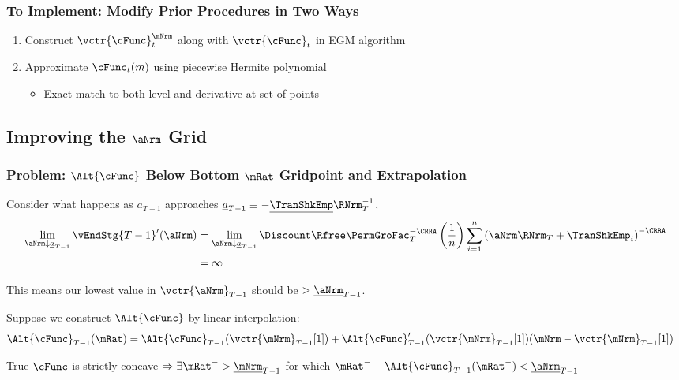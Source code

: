 \documentclass{beamer}
\begin{document}
\begin{frame}
\frametitle{To Implement: Modify Prior Procedures in Two Ways}
\begin{enumerate}
\item Construct $\vctr{\cFunc}^{\mNrm}_{t}$ along with $\vctr{\cFunc}_{t}$ in EGM algorithm
\item Approximate $\cFunc_{t}(m)$ using piecewise Hermite polynomial
\begin{itemize}
\item Exact match to both level and derivative at set of points
\end{itemize}
\end{enumerate}
\end{frame}


\subsection{Improving the $\aNrm$ Grid}

\begin{frame}
\frametitle{Problem: $\Alt{\cFunc}$ Below Bottom $\mRat$ Gridpoint and Extrapolation}

Consider what happens as $a_{T-1}$ approaches $\underline{a}_{T-1}\equiv-\underline{\TranShkEmp}\RNrm_{T}^{-1}$,
\begin{equation*}\begin{gathered}\begin{aligned}
        \lim_{{\aNrm} \downarrow \underline{a}_{T-1}} \vEndStg{T-1}^{\prime}(\aNrm) 
& =         \lim_{{\aNrm} \downarrow \underline{a}_{T-1}} \Discount \Rfree \PermGroFac_{T}^{-\CRRA} \left(\frac{1}{n}\right) \sum_{i=1}^{n} \left(  \aNrm\RNrm_{T}+ \TranShkEmp_{i}\right)^{-\CRRA}
\\  & = \infty
\end{aligned}\end{gathered}\end{equation*}

This means our lowest value in $\vctr{\aNrm}_{T-1}$ should be $> \underline{\aNrm}_{T-1}$.  

\medskip
Suppose we construct $\Alt{\cFunc}$ by linear interpolation:
\begin{equation*}\begin{gathered}\begin{aligned}
  \Alt{\cFunc}_{T-1}(\mRat)  & = \Alt{\cFunc}_{T-1}(\vctr{\mNrm}_{T-1}[1])+\Alt{\cFunc}_{T-1}^{\prime}(\vctr{\mNrm}_{T-1}[1])(\mNrm-\vctr{\mNrm}_{T-1}[1]) \label{eq:ExtrapLin}
\end{aligned}\end{gathered}\end{equation*}

True $\cFunc$ is strictly concave 
$\Rightarrow \exists \mRat^{-} > \underline{\mNrm}_{T-1}$  for which $\mRat^{-}-\Alt{\cFunc}_{T-1}(\mRat^{-}) < \underline{\aNrm}_{T-1}$

\end{frame}
\end{document}
